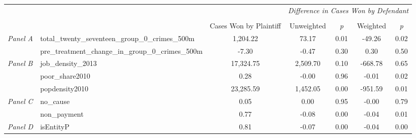 \begin{tabular}{llccccc}
\toprule
 &  & \textit{} & \multicolumn{4}{c}{\textit{Difference in Cases Won by Defendant}} \\
\cline{4-7}
\\
 &  & Cases Won by Plaintiff & Unweighted & \emph{p} & Weighted & \emph{p} \\
\midrule
\multirow[c]{2}{3cm}{\textit{Panel A}} & total_twenty_seventeen_group_0_crimes_500m & 1,204.22 & 73.17 & 0.01 & -49.26 & 0.02 \\
 & pre_treatment_change_in_group_0_crimes_500m & -7.30 & -0.47 & 0.30 & 0.30 & 0.50 \\
\cline{1-7}
\multirow[c]{3}{3cm}{\textit{Panel B}} & job_density_2013 & 17,324.75 & 2,509.70 & 0.10 & -668.78 & 0.65 \\
 & poor_share2010 & 0.28 & -0.00 & 0.96 & -0.01 & 0.02 \\
 & popdensity2010 & 23,285.59 & 1,452.05 & 0.00 & -951.59 & 0.01 \\
\cline{1-7}
\multirow[c]{2}{3cm}{\textit{Panel C}} & no_cause & 0.05 & 0.00 & 0.95 & -0.00 & 0.79 \\
 & non_payment & 0.77 & -0.08 & 0.00 & -0.04 & 0.01 \\
\cline{1-7}
\textit{Panel D} & isEntityP & 0.81 & -0.07 & 0.00 & -0.04 & 0.00 \\
\cline{1-7}
\bottomrule
\end{tabular}

